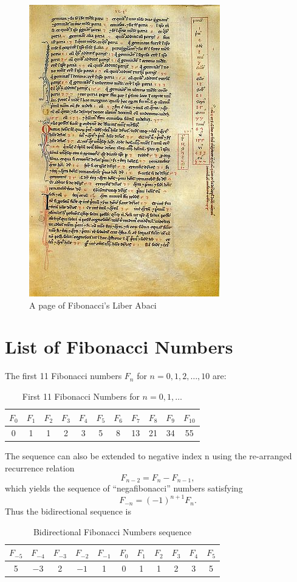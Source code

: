 \begin{figure}[hbt!]
\centering
\includegraphics[width=.4\textwidth]{314px-Liber-abbaci-magliab-f124r}
\caption{A page of Fibonacci's Liber Abaci
}
\end{figure}

\section{List of Fibonacci Numbers}

The first 11 Fibonacci numbers $F_n$ for $n = 0, 1, 2, \ldots, 10$ are:

\begin{table}[hbt!]\centering
\caption{First 11 Fibonacci Numbers for $n=0,1,\ldots$}
\begin{tabular}{|c|c|c|c|c|c|c|c|c|c|c|}
\hline
$F_0$ & $F_1$ & $F_2$ & $F_3$ & $F_4$ & $F_5$ & $F_6$ & $F_7$ & $F_8$ & $F_9$ & $F_{10}$\\
\hline
0 & 1 & 1 & 2 & 3 & 5 & 8 & 13 & 21 & 34 & 55 \\
\hline
\end{tabular}
\end{table}

The sequence can also be extended to negative index n using the re-arranged recurrence relation
%
\begin{equation}
F_{n-2} = F_n - F_{n-1},
\end{equation}
%
which yields the sequence of ``negafibonacci'' numbers satisfying
%
\begin{equation}
F_{-n} = (-1)^{n+1} F_n.
\end{equation}
%
Thus the bidirectional sequence is
\begin{table}[hbt!]\centering
\caption{Bidirectional Fibonacci Numbers sequence}
\begin{tabular}{|c|c|c|c|c|c|c|c|c|c|c|}
\hline
$F_{-5}$ & $F_{-4}$ & $F_{-3}$ & $F_{-2}$ & $F_{-1}$ & $F_0$ & $F_1$ & $F_2$ & $F_3$ & $F_4$ & $F_5$ \\\hline
5 & $-3$ & 2 & $-1$ & 1 & 0 & 1 & 1 & 2 & 3 & 5\\\hline
\end{tabular}
\end{table}

